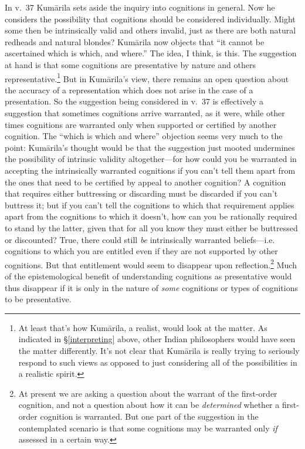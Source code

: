 \documentclass[11pt,letterpaper,oneside]{amsart}
\newcommand{\kum}{Kum\={a}rila}
\begin{document}
In v.\ 37 Kum\=arila sets aside the inquiry into cognitions in general. Now he considers the possibility that cognitions should be considered individually. Might some then be intrinsically valid and others invalid, just as there are both natural redheads and natural blondes? Kum\=arila now objects that ``it cannot be ascertained which is which, and where.'' The idea, I think, is this. The suggestion at hand is that some cognitions are presentative by nature and others representative.\footnote{At least that's how Kum\=arila, a realist, would look at the matter. As indicated in \S\ref{interpreting} above, other Indian philosophers would have seen the matter differently. It's not clear that Kum\=arila is really trying to seriously respond to such views as opposed to just considering all of the possibilities in a realistic spirit.} But in \kum's view, there remains an open question about the accuracy of a representation which does not arise in the case of a presentation. So the suggestion being considered in v.\ 37 is effectively a suggestion that sometimes cognitions arrive warranted, as it were, while other times cognitions are warranted only when supported or certified by another cognition. The ``which is which and where'' objection seems very much to the point: \kum's thought would be that the suggestion just mooted undermines the possibility of intrinsic validity altogether---for how could you be warranted in accepting the intrinsically warranted cognitions if you can't tell them apart from the ones that need to be certified by appeal to another cognition? A cognition that requires either buttressing or discarding must be discarded if you can't buttress it; but if you can't tell the cognitions to which that requirement applies apart from the cognitions to which it doesn't, how can you be rationally required to stand by the latter, given that for all you know they must either be buttressed or discounted? True, there could still \emph{be} intrinsically warranted beliefs---i.e. cognitions to which you are entitled even if they are not supported by other cognitions. But that entitlement would seem to disappear upon reflection.\footnote{At present we are asking a question about the warrant of the first-order cognition, and not a question about how it can be \emph{determined} whether a first-order cognition is warranted. But one part of the suggestion in the contemplated scenario is that some cognitions may be warranted only \emph{if} assessed in a certain way.} Much of the epistemological benefit of understanding cognitions as presentative would thus disappear if it is only in the nature of \emph{some} cognitions or types of cognitions to be presentative.
\end{document}
